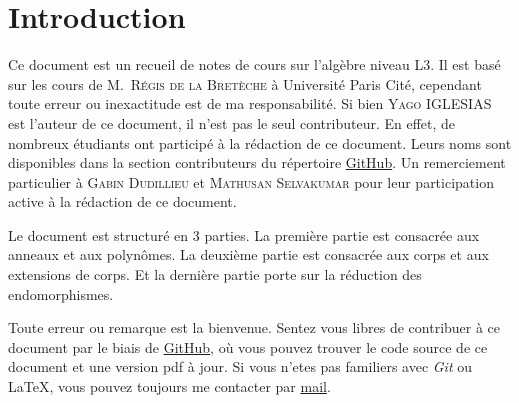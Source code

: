 
\section{Introduction}

Ce document est un recueil de notes de cours sur l'algèbre niveau L3. Il est
basé sur les cours de M.~\textsc{Régis de la Bretèche} à Université Paris Cité, cependant toute 
erreur ou inexactitude est de ma responsabilité.
Si bien \textsc{Yago IGLESIAS} est l'auteur de ce document, il n'est pas
le seul contributeur. En effet, de nombreux étudiants ont participé à la
rédaction de ce document. Leurs noms sont disponibles dans la section
contributeurs du répertoire \href{https://github.com/Yag000/algebre-II-notes/graphs/contributors}{GitHub}.
Un remerciement particulier à \textsc{Gabin Dudillieu} et \textsc{Mathusan Selvakumar} pour leur
participation active à la rédaction de ce document.
\vspace{0.5cm}

Le document est structuré en 3 parties. La première partie est consacrée aux anneaux et aux polynômes.
La deuxième partie est consacrée aux corps et aux extensions de corps. Et la dernière partie porte sur
la réduction des endomorphismes.
\vspace{0.5cm}

Toute erreur ou remarque est la bienvenue. 
Sentez vous libres de contribuer à ce document par le biais de \href{https://github.com/Yag000/algebre-II-notes}{GitHub}, 
où vous pouvez trouver le code source de ce document et une version pdf à jour.
Si vous n'etes pas familiers avec \textit{Git} ou \LaTeX , vous pouvez toujours me contacter
par \href{mailto: yago.iglesias.vazquez@gmail.com}{mail}.






